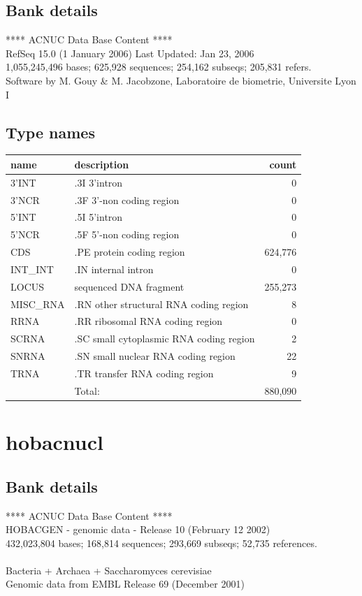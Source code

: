 \documentclass{article}
\begin{document}
\begin{Schunk}
\subsection{Bank details}
             ****     ACNUC Data Base Content      ****                         \\
               RefSeq 15.0 (1 January 2006) Last Updated: Jan 23, 2006\\
1,055,245,496 bases; 625,928 sequences; 254,162 subseqs; 205,831 refers.\\
Software by M. Gouy \& M. Jacobzone, Laboratoire de biometrie, Universite Lyon I 

\subsection{Type names}
\noindent\begin{tabular}{llr}
\hline \hline
name & description & count \\
\hline
3'INT  &  .3I 3'intron  &  0 \\
3'NCR  &  .3F  3'-non coding region  &  0 \\
5'INT  &  .5I 5'intron  &  0 \\
5'NCR  &  .5F  5'-non coding region  &  0 \\
CDS  &  .PE protein coding region  &  624,776 \\
INT\_INT  &  .IN  internal intron  &  0 \\
LOCUS  &  sequenced DNA fragment  &  255,273 \\
MISC\_RNA  &  .RN other structural RNA coding region  &  8 \\
RRNA  &  .RR ribosomal RNA coding region  &  0 \\
SCRNA  &  .SC small cytoplasmic RNA coding region  &  2 \\
SNRNA  &  .SN small nuclear RNA coding region  &  22 \\
TRNA  &  .TR transfer RNA coding region  &  9 \\
\hline
 & Total: & 880,090 \\
\hline \hline
\end{tabular}

\section{ hobacnucl }
\subsection{Bank details}
               ****     ACNUC Data Base Content      ****                      \\
          HOBACGEN - genomic data - Release 10 (February 12 2002)\\
432,023,804 bases; 168,814 sequences; 293,669 subseqs; 52,735 references.\\
                                                                               \\
              Bacteria + Archaea + Saccharomyces cerevisiae\\
            Genomic data from EMBL Release 69 (December 2001)\\



\end{Schunk}
\end{document}
